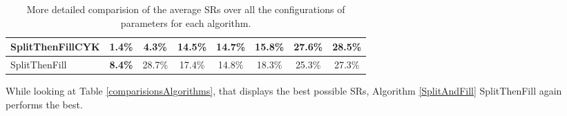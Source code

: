 \begin{table}[h]
\begin{tabular}{|l|c|c|c|c|c|c|c|}
		SplitThenFillCYK                   &\textbf{1.4\%}    &4.3\%                                                           &14.5\%                                                              &14.7\%      &15.8\%                                                        &27.6\%                                                         &28.5\%                                                           \\ \hline
		SplitThenFill                    &\textbf{8.4\%}      &28.7\%                                                           &17.4\%                                                              &14.8\%      &18.3\%                                                        &25.3\%                                                         &27.3\%                                                           \\ \hline
	\end{tabular}
	\caption{More detailed comparision of the average SRs over all the configurations of parameters for each algorithm.}
	\label{comparisionsAlgorithmsMean}
\end{table}
\noindent While looking at Table \ref{comparisionsAlgorithms}, that displays the best possible SRs, Algorithm \ref{SplitAndFill} SplitThenFill again performs the best.\\
 
